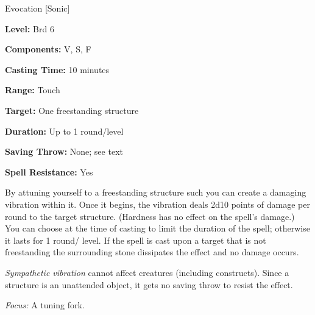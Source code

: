 
Evocation [Sonic]

\textbf{Level:} Brd 6

\textbf{Components:} V, S, F

\textbf{Casting Time:} 10 minutes

\textbf{Range:} Touch

\textbf{Target:} One freestanding structure

\textbf{Duration:} Up to 1 round/level

\textbf{Saving Throw:} None; see text

\textbf{Spell Resistance:} Yes

By attuning yourself to a freestanding structure such you can create a damaging 
vibration within it. Once it begins, the vibration deals 2d10 points of damage 
per round to the target structure. (Hardness has no effect on the spell's damage.) 
You can choose at the time of casting to limit the duration of the spell; otherwise 
it lasts for 1 round/ level. If the spell is cast upon a target that is not freestanding 
the surrounding stone dissipates the effect and no damage occurs.

\textit{Sympathetic vibration} cannot affect creatures (including constructs). 
Since a structure is an unattended object, it gets no saving throw to resist the 
effect.

\textit{Focus:} A tuning fork.

